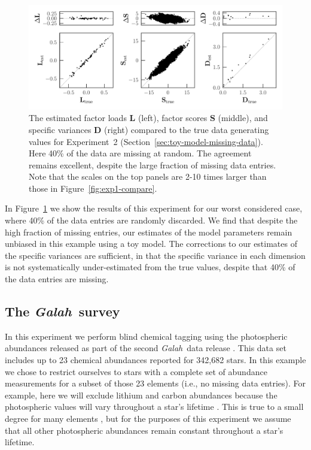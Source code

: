 \documentclass[twocolumn]{aastex62}
\newcommand{\project}[1]{\textsl{#1}}
\newcommand{\Galah}{\project{Galah}}
\newcommand{\vect}[1]{\boldsymbol{\mathbf{#1}}}
\renewcommand{\vec}[1]{\vect{#1}}
\newcommand{\factorloads}{\textbf{L}}
\newcommand{\factorscores}{\textbf{S}}
\newcommand{\specificvariance}{\vec{D}}
\begin{document}
\begin{figure}[t!]
	\includegraphics[width=\textwidth]{experiments/eval-figs/eval-3-missing-data-40.pdf}
	\caption{The estimated factor loads $\factorloads$ (left), factor scores $\factorscores$ (middle),
    		 and specific variances $\specificvariance$ (right) compared to the 
		 	 true data generating values
		 	 for Experiment~2 (Section~\ref{sec:toy-model-missing-data}). Here 40\% of the data are missing at random.
			 The agreement remains excellent,
			 despite the large fraction of missing data entries. Note that the scales on the top panels are 2-10 times larger than those in Figure~\ref{fig:exp1-compare}.}
    \label{fig:exp1-missing-data}
\end{figure}


In Figure~\ref{fig:exp1-missing-data} we show the results of this
experiment for our worst considered case, where 40\% of the data
entries are randomly discarded. We find that despite the high fraction
of missing entries, our estimates of the model parameters remain unbiased
in this example using a toy model. The corrections to our estimates of the
specific variances are sufficient, in that the specific variance in each
dimension is not systematically under-estimated from the true values, 
despite that 40\% of the data entries are missing.


\vspace{2em}

\subsection{The \Galah\ survey}
\label{sec:exp4}

In this experiment we perform blind chemical tagging using the 
photospheric abundances released as part of the second \Galah\ 
data release \citep{Buder:2018}. This data set includes
up to 23 chemical abundances reported for 342,682 stars.
In this example we chose to restrict ourselves to stars with a
complete set of abundance measurements for a subset of those 23 elements
(i.e., no missing data entries).
For example, here we will exclude
lithium and carbon abundances because the
photospheric values will vary throughout a star's lifetime \citep[e.g.,][]{Casey:2016b,Casey:2019}. This is true
to a small degree for many elements \citep[e.g.,][]{Dotter:2017},
but for the purposes of this experiment we assume that all other
photospheric abundances remain constant throughout a star's
lifetime.
\end{document}
